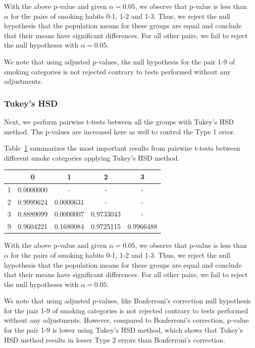 \documentclass[fontsize=12 pt]{scrartcl}
\begin{document}
With the above p-value and given $\alpha=0.05$, we observe that p-value is less than $\alpha$ for the pairs of smoking habits 0-1, 1-2 and 1-3. Thus, we reject the null hypothesis that the population means for these groups are equal and conclude that their means have significant differences. For all other pairs, we fail to reject the null hypotheses with $\alpha=0.05$.

We note that using adjusted p-values, the null hypothesis for the pair 1-9 of smoking categories is not rejected contrary to tests performed without any adjustments.

\subsubsection{Tukey's HSD}
Next, we perform pairwise t-tests between all the groups with Tukey's HSD method. The p-values are increased here as well to control the Type 1 error.

Table~\ref{tab:tukey} summarizes the most important results from pairwise t-tests between different smoke categories applying Tukey's HSD method.

\begin{table}[ht]
\centering
{}
\label{tab:tukey}
\begin{tabular}{c|c|c|c|c}
 & 0  & 1 & 2 &3 \\
\hline
1 & 0.0000000 & - & - & - \\
2 & 0.9999624 & 0.0000631 & - & -  \\
3 & 0.8889099 & 0.0000007 & 0.9733043 & - \\ 
9 & 0.9604221 & 0.1680084 & 0.9725115 & 0.9966488
\end{tabular}
\end{table}

With the above p-value and given $\alpha=0.05$, we observe that p-value is less than $\alpha$ for the pairs of smoking habits 0-1, 1-2 and 1-3. Thus, we reject the null hypothesis that the population means for these groups are equal and conclude that their means have significant differences. For all other pairs, we fail to reject the null hypotheses with $\alpha=0.05$.

We note that using adjusted p-values, like Bonferroni's correction null hypothesis for the pair 1-9 of smoking categories is not rejected contrary to tests performed without any adjustments.
However, compared to Bonferroni's correction, p-value for the pair 1-9 is lower using Tukey's HSD method, which shows that Tukey's HSD method results in lesser Type 2 errors than Bonferroni's correction.
\end{document}
